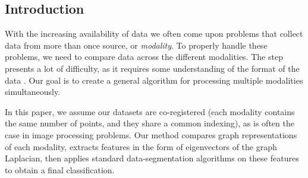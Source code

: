\documentclass[a0,landscape]{a0poster}
\begin{document}
\begin{multicols}{4} %



  \color{SaddleBrown} %
  \section*{Introduction}
  With the increasing availability of data we often come upon problems that
  collect data from more than once source, or \emph{modality}. To properly
  handle these problems, we need to compare data across the different
  modalities. The step presents a lot of difficulty, as it requires some
  understanding of the format of the data \cite{lahat:hal-01062366}. Our goal is
  to create a general algorithm for processing multiple modalities
  simultaneously.

  In this paper, we assume our datasets are co-registered (each modality
  contains the same number of points, and they share a common indexing), as is
  often the case in image processing problems. Our method compares graph
  representations of each modality, extracts features in the form of
  eigenvectors of the graph Laplacian, then applies standard data-segmentation
  algorithms on these features to obtain a final classification.
  \color{DarkSlateGray} %

\end{multicols}
\end{document}

